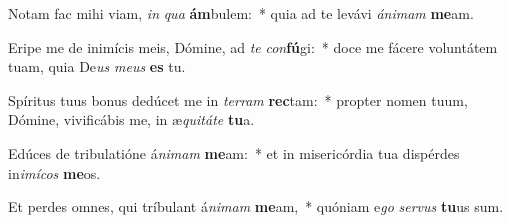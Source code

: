 \item Notam fac mihi viam, \textit{in} \textit{qua} \textbf{ám}bulem:~* quia ad te levávi \textit{á}\textit{ni}\textit{mam} \textbf{me}am.
\item Eripe me de inimícis meis, Dómine, ad \textit{te} \textit{con}\textbf{fú}gi:~* doce me fácere voluntátem tuam, quia De\textit{us} \textit{me}\textit{us} \textbf{es} tu.
\item Spíritus tuus bonus dedúcet me in \textit{ter}\textit{ram} \textbf{rec}tam:~* propter nomen tuum, Dómine, vivificábis me, in æ\textit{qui}\textit{tá}\textit{te} \textbf{tu}a.
\item Edúces de tribulatióne á\textit{ni}\textit{mam} \textbf{me}am:~* et in misericórdia tua dispérdes in\textit{i}\textit{mí}\textit{cos} \textbf{me}os.
\item Et perdes omnes, qui tríbulant á\textit{ni}\textit{mam} \textbf{me}am,~* quóniam e\textit{go} \textit{ser}\textit{vus} \textbf{tu}us sum.
